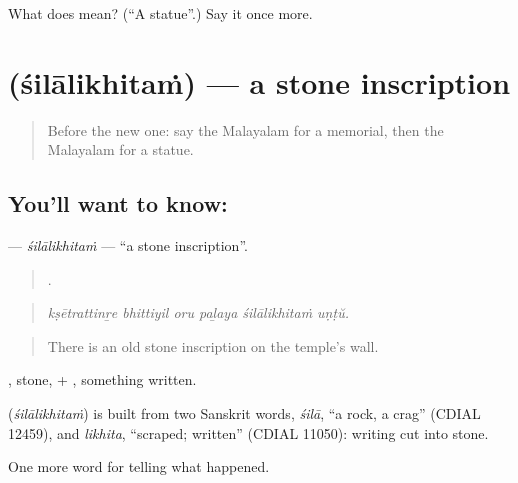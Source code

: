 \begin{tcolorbox}[breakable,colback=teal!4,colframe=teal!35!black,title={Before you move on}]
What does  mean? (\textquotedblleft{}A statue\textquotedblright{}.) Say it once more.
\end{tcolorbox}
\section[\texorpdfstring{\ml{ശിലാലിഖിതം} (śilālikhitaṁ)}{ശിലാലിഖിതം (śilālikhitaṁ)}]{ (śilālikhitaṁ) — a stone inscription}

\label{lesson:ML-C393-silalikhitam}



\begin{quote}
Before the new one: say the Malayalam for a memorial, then the Malayalam for a statue.
\end{quote}

\subsection*{You'll want to know: }
\textbf{} — \emph{śilālikhitaṁ} — \textquotedblleft{}a stone inscription\textquotedblright{}.

\begin{quote}
     .
\end{quote}

\begin{quote}
\emph{kṣētrattinṟe bhittiyil oru paḻaya śilālikhitaṁ uṇṭŭ.}
\end{quote}

\begin{quote}
There is an old stone inscription on the temple's wall.
\end{quote}

, stone, + , something written.

\begin{cousinweb}
\textbf{} (\emph{śilālikhitaṁ}) is built from two Sanskrit words, \emph{śilā}, \textquotedblleft{}a rock, a crag\textquotedblright{} (CDIAL 12459), and \emph{likhita}, \textquotedblleft{}scraped; written\textquotedblright{} (CDIAL 11050): writing cut into stone.
\end{cousinweb}

\begin{grammarlens}[title={What you've built}]
One more word for telling what happened.
\end{grammarlens}

